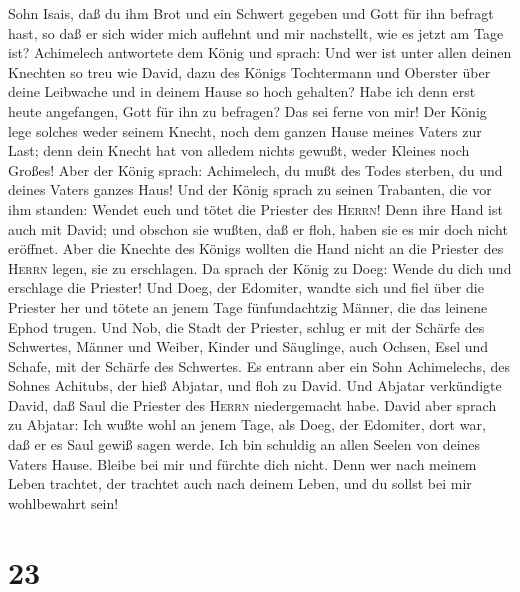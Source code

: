 Sohn Isais, daß du ihm Brot und ein Schwert gegeben und Gott für ihn
befragt hast, so daß er sich wider mich auflehnt und mir nachstellt, wie
es jetzt am Tage ist?  Achimelech antwortete dem König
und sprach: Und wer ist unter allen deinen Knechten so treu wie David,
dazu des Königs Tochtermann und Oberster über deine Leibwache und in
deinem Hause so hoch gehalten?  Habe ich denn erst heute
angefangen, Gott für ihn zu befragen? Das sei ferne von mir! Der König
lege solches weder seinem Knecht, noch dem ganzen Hause meines Vaters
zur Last; denn dein Knecht hat von alledem nichts gewußt, weder Kleines
noch Großes!  Aber der König sprach: Achimelech, du mußt
des Todes sterben, du und deines Vaters ganzes Haus!  Und
der König sprach zu seinen Trabanten, die vor ihm standen: Wendet euch
und tötet die Priester des \textsc{Herrn}! Denn ihre Hand ist auch mit
David; und obschon sie wußten, daß er floh, haben sie es mir doch nicht
eröffnet. Aber die Knechte des Königs wollten die Hand nicht an die
Priester des \textsc{Herrn} legen, sie zu erschlagen.  Da
sprach der König zu Doeg: Wende du dich und erschlage die Priester! Und
Doeg, der Edomiter, wandte sich und fiel über die Priester her und
tötete an jenem Tage fünfundachtzig Männer, die das leinene Ephod
trugen.  Und Nob, die Stadt der Priester, schlug er mit
der Schärfe des Schwertes, Männer und Weiber, Kinder und Säuglinge, auch
Ochsen, Esel und Schafe, mit der Schärfe des Schwertes. 
Es entrann aber ein Sohn Achimelechs, des Sohnes Achitubs, der hieß
Abjatar, und floh zu David.  Und Abjatar verkündigte
David, daß Saul die Priester des \textsc{Herrn} niedergemacht habe.
 David aber sprach zu Abjatar: Ich wußte wohl an jenem
Tage, als Doeg, der Edomiter, dort war, daß er es Saul gewiß sagen
werde. Ich bin schuldig an allen Seelen von deines Vaters Hause.
 Bleibe bei mir und fürchte dich nicht. Denn wer nach
meinem Leben trachtet, der trachtet auch nach deinem Leben, und du
sollst bei mir wohlbewahrt sein!

\hypertarget{section-22}{%
\section{23}\label{section-22}}

